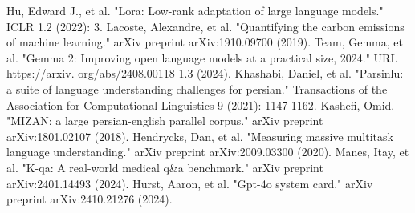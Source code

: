\documentclass[conference]{IEEEtran}
\begin{document}
\begin{thebibliography}{00}
 Hu, Edward J., et al. "Lora: Low-rank adaptation of large language models." ICLR 1.2 (2022): 3.
 Lacoste, Alexandre, et al. "Quantifying the carbon emissions of machine learning." arXiv preprint arXiv:1910.09700 (2019).
 Team, Gemma, et al. "Gemma 2: Improving open language models at a practical size, 2024." URL https://arxiv. org/abs/2408.00118 1.3 (2024).
 Khashabi, Daniel, et al. "Parsinlu: a suite of language understanding challenges for persian." Transactions of the Association for Computational Linguistics 9 (2021): 1147-1162.
 Kashefi, Omid. "MIZAN: a large persian-english parallel corpus." arXiv preprint arXiv:1801.02107 (2018).
 Hendrycks, Dan, et al. "Measuring massive multitask language understanding." arXiv preprint arXiv:2009.03300 (2020).
 Manes, Itay, et al. "K-qa: A real-world medical q\&a benchmark." arXiv preprint arXiv:2401.14493 (2024).
 Hurst, Aaron, et al. "Gpt-4o system card." arXiv preprint arXiv:2410.21276 (2024).
\end{thebibliography}
\end{document}

